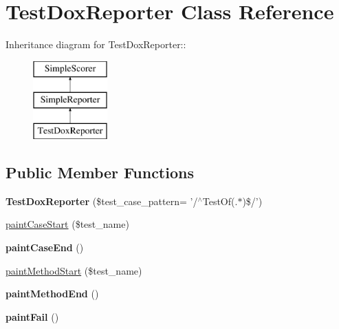 \hypertarget{class_test_dox_reporter}{
\section{TestDoxReporter Class Reference}
\label{class_test_dox_reporter}
}
Inheritance diagram for TestDoxReporter::\begin{figure}[H]
\begin{center}
\leavevmode
\includegraphics[height=3cm]{class_test_dox_reporter}
\end{center}
\end{figure}
\subsection*{Public Member Functions}
\begin{DoxyCompactItemize}
\item 
\hypertarget{class_test_dox_reporter_a83d8996609053a822932c304f8a35c25}{
{\bfseries TestDoxReporter} (\$test\_\-case\_\-pattern= '/$^\wedge$TestOf(.$\ast$)\$/')}
\label{class_test_dox_reporter_a83d8996609053a822932c304f8a35c25}

\item 
\hyperlink{class_test_dox_reporter_a0675ceed8813548f9d1bafc71c794f24}{paintCaseStart} (\$test\_\-name)
\item 
\hypertarget{class_test_dox_reporter_a4a52bba11f0032c739aac1487bc970fd}{
{\bfseries paintCaseEnd} ()}
\label{class_test_dox_reporter_a4a52bba11f0032c739aac1487bc970fd}

\item 
\hyperlink{class_test_dox_reporter_a1d7d83c7832d12c8626245ec38b80a96}{paintMethodStart} (\$test\_\-name)
\item 
\hypertarget{class_test_dox_reporter_ac23d9bff6582270e5d89fed8a1d8b5f5}{
{\bfseries paintMethodEnd} ()}
\label{class_test_dox_reporter_ac23d9bff6582270e5d89fed8a1d8b5f5}

\item 
\hypertarget{class_test_dox_reporter_a7c12c5f669b17f0d05bb4990c90fb5b5}{
{\bfseries paintFail} ()}
\label{class_test_dox_reporter_a7c12c5f669b17f0d05bb4990c90fb5b5}

\end{DoxyCompactItemize}
